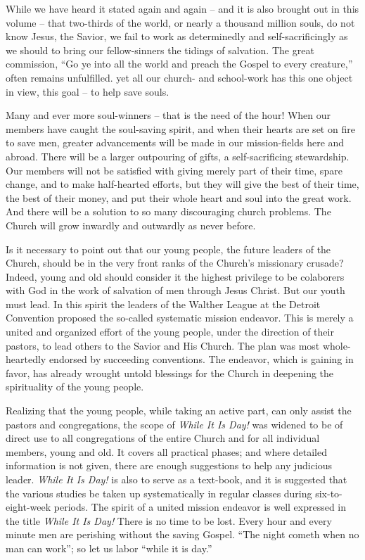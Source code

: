 \documentclass[
]{book}
\begin{document}
While we have heard it stated again and again -- and it is also brought out in this volume -- that two-thirds of the world, or nearly a thousand million souls, do not know Jesus, the Savior, we fail to work as determinedly and self-sacrificingly as we should to bring our fellow-sinners the tidings of salvation. The great commission, ``Go ye into all the world and preach the Gospel to every creature,'' often remains unfulfilled. yet all our church- and school-work has this one object in view, this goal -- to help save souls.

Many and ever more soul-winners -- that is the need of the hour! When our members have caught the soul-saving spirit, and when their hearts are set on fire to save men, greater advancements will be made in our mission-fields here and abroad. There will be a larger outpouring of gifts, a self-sacrificing stewardship. Our members will not be satisfied with giving merely part of their time, spare change, and to make half-hearted efforts, but they will give the best of their time, the best of their money, and put their whole heart and soul into the great work. And there will be a solution to so many discouraging church problems. The Church will grow inwardly and outwardly as never before.

Is it necessary to point out that our young people, the future leaders of the Church, should be in the very front ranks of the Church's missionary crusade? Indeed, young and old should consider it the highest privilege to be colaborers with God in the work of salvation of men through Jesus Christ. But our youth must lead. In this spirit the leaders of the Walther League at the Detroit Convention proposed the so-called systematic mission endeavor. This is merely a united and organized effort of the young people, under the direction of their pastors, to lead others to the Savior and His Church. The plan was most whole-heartedly endorsed by succeeding conventions. The endeavor, which is gaining in favor, has already wrought untold blessings for the Church in deepening the spirituality of the young people.

Realizing that the young people, while taking an active part, can only assist the pastors and congregations, the scope of \emph{While It Is Day!} was widened to be of direct use to all congregations of the entire Church and for all individual members, young and old. It covers all practical phases; and where detailed information is not given, there are enough suggestions to help any judicious leader. \emph{While It Is Day!} is also to serve as a text-book, and it is suggested that the various studies be taken up systematically in regular classes during six-to-eight-week periods. The spirit of a united mission endeavor is well expressed in the title \emph{While It Is Day!} There is no time to be lost. Every hour and every minute men are perishing without the saving Gospel. ``The night cometh when no man can work''; so let us labor ``while it is day.''
\end{document}
